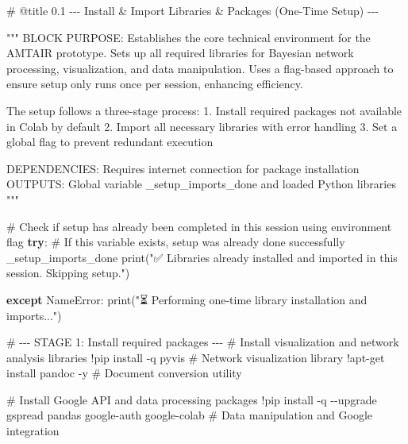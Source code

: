 \documentclass[
  11pt,
  letterpaper,
]{book}
\newenvironment{Shaded}{\begin{snugshade}}{\end{snugshade}}
\newcommand{\BuiltInTok}[1]{\textcolor[rgb]{0.00,0.23,0.31}{#1}}
\newcommand{\CommentTok}[1]{\textcolor[rgb]{0.37,0.37,0.37}{#1}}
\newcommand{\ControlFlowTok}[1]{\textcolor[rgb]{0.00,0.23,0.31}{\textbf{#1}}}
\newcommand{\NormalTok}[1]{\textcolor[rgb]{0.00,0.23,0.31}{#1}}
\newcommand{\OperatorTok}[1]{\textcolor[rgb]{0.37,0.37,0.37}{#1}}
\newcommand{\PreprocessorTok}[1]{\textcolor[rgb]{0.68,0.00,0.00}{#1}}
\newcommand{\StringTok}[1]{\textcolor[rgb]{0.13,0.47,0.30}{#1}}
\begin{document}
\begin{Shaded}
\begin{Highlighting}[]
\CommentTok{\# @title 0.1 {-}{-}{-} Install \& Import Libraries \& Packages (One{-}Time Setup) {-}{-}{-}}

\CommentTok{"""}
\CommentTok{BLOCK PURPOSE: Establishes the core technical environment for the AMTAIR prototype.}
\CommentTok{Sets up all required libraries for Bayesian network processing, visualization, and data manipulation.}
\CommentTok{Uses a flag{-}based approach to ensure setup only runs once per session, enhancing efficiency.}

\CommentTok{The setup follows a three{-}stage process:}
\CommentTok{1. Install required packages not available in Colab by default}
\CommentTok{2. Import all necessary libraries with error handling}
\CommentTok{3. Set a global flag to prevent redundant execution}

\CommentTok{DEPENDENCIES: Requires internet connection for package installation}
\CommentTok{OUTPUTS: Global variable \_setup\_imports\_done and loaded Python libraries}
\CommentTok{"""}

\CommentTok{\#  Check if setup has already been completed in this session using environment flag}
\ControlFlowTok{try}\NormalTok{:}
    \CommentTok{\# If this variable exists, setup was already done successfully}
\NormalTok{    \_setup\_imports\_done}
    \BuiltInTok{print}\NormalTok{(}\StringTok{"✅ Libraries already installed and imported in this session. Skipping setup."}\NormalTok{)}

\ControlFlowTok{except} \PreprocessorTok{NameError}\NormalTok{:}
    \BuiltInTok{print}\NormalTok{(}\StringTok{"⏳ Performing one{-}time library installation and imports..."}\NormalTok{)}

    \CommentTok{\# {-}{-}{-} STAGE 1: Install required packages {-}{-}{-}}
    \CommentTok{\# Install visualization and network analysis libraries}
    \OperatorTok{!}\NormalTok{pip install }\OperatorTok{{-}}\NormalTok{q pyvis  }\CommentTok{\# Network visualization library}
    \OperatorTok{!}\NormalTok{apt}\OperatorTok{{-}}\NormalTok{get install pandoc }\OperatorTok{{-}}\NormalTok{y  }\CommentTok{\# Document conversion utility}

    \CommentTok{\# Install Google API and data processing packages}
    \OperatorTok{!}\NormalTok{pip install }\OperatorTok{{-}}\NormalTok{q }\OperatorTok{{-}{-}}\NormalTok{upgrade gspread pandas google}\OperatorTok{{-}}\NormalTok{auth google}\OperatorTok{{-}}\NormalTok{colab  }\CommentTok{\# Data manipulation and Google integration}


\end{Highlighting}
\end{Shaded}
\end{document}
